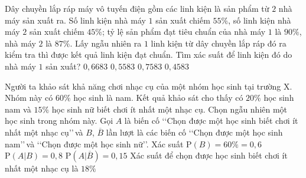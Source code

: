 \begin{ex}%
	Dây chuyền lắp ráp máy vô tuyến điện gồm các linh kiện là sản phẩm từ $2$ nhà máy sản xuất ra. Số linh kiện nhà máy $1$ sản xuất chiếm $55\%$, số linh kiện nhà máy $2$ sản xuất chiếm $45\%$; tỷ lệ sản phẩm đạt tiêu chuẩn của nhà máy $1$ là $90\%$, nhà máy $2$ là $87\%$. Lấy ngẫu nhiên ra $1$ linh kiện từ dây chuyền lắp ráp đó ra kiểm tra thì được kết quả linh kiện đạt chuẩn. Tìm xác suất để linh kiện đó do nhà máy $1$ sản xuất?
	\choice
	{$0{,}6683$}
	{\True$0{,}5583$}
	{$0{,}7583$}
	{$0{,}4583$}
\end{ex}

\begin{ex}%
	Người ta khảo sát khả năng chơi nhạc cụ của một nhóm học sinh tại trường X. Nhóm này có $60\%$ học sinh là nam. Kết quả khảo sát cho thấy có $20\%$ học sinh nam và $15\%$ học sinh nữ biết chơi ít nhất một nhạc cụ. Chọn ngẫu nhiên một học sinh trong nhóm này. Gọi $A$ là biến cố \lq\lq  Chọn được một học sinh biết chơi ít nhất một nhạc cụ\rq\rq\,và $B$, $\overline{B}$ lần lượt là các biến cố \lq\lq  Chọn được một học sinh nam\rq\rq\,và \lq\lq  Chọn được một học sinh nữ\rq\rq. 
	\choiceTF
	{\True Xác suất $\mathrm{P}(B) = 60\% = 0{,}6$}
	{$\mathrm{P}(A|B) = 0{,}8$}
	{\True $\mathrm{P}(A|\overline{B}) = 0{,}15$}
	{\True Xác suất để chọn được học sinh biết chơi ít nhất một nhạc cụ là $18\%$}
\end{ex}

